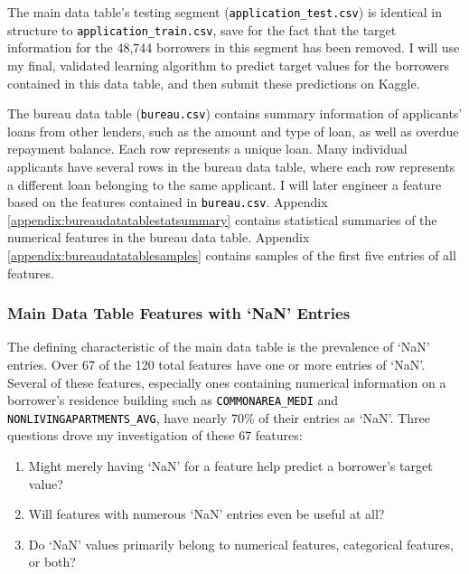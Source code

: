 \documentclass[12pt, letterpaper]{article}
\begin{document}
The main data table's testing segment (\colorbox{backcolor}{\textcolor{black}{\texttt{application_test.csv}}}) is identical in structure to \colorbox{backcolor}{\textcolor{black}{\texttt{application_train.csv}}}, save for the fact that the target information for the 48,744 borrowers in this segment has been removed. I will use my final, validated learning algorithm to predict target values for the borrowers contained in this data table, and then submit these predictions on Kaggle.

The bureau data table (\colorbox{backcolor}{\textcolor{black}{\texttt{bureau.csv}}}) contains summary information of applicants' loans from other lenders, such as the amount and type of loan, as well as overdue repayment balance. Each row represents a unique loan. Many individual applicants have several rows in the bureau data table, where each row represents a different loan belonging to the same applicant. I will later engineer a feature based on the features contained in \colorbox{backcolor}{\textcolor{black}{\texttt{bureau.csv}}}. Appendix \ref{appendix:bureaudatatablestatsummary} contains statistical summaries of the numerical features in the bureau data table. Appendix \ref{appendix:bureaudatatablesamples} contains samples of the first five entries of all features.

\subsubsection{Main Data Table Features with `NaN' Entries}
The defining characteristic of the main data table is the prevalence of `NaN' entries. Over 67 of the 120 total features have one or more entries of `NaN'. Several of these features, especially ones containing numerical information on a borrower's residence building such as \colorbox{backcolor}{\textcolor{black}{\texttt{COMMONAREA_MEDI}}} and
\colorbox{backcolor}{\textcolor{black}{\texttt{NONLIVINGAPARTMENTS_AVG}}}, have nearly 70\% of their entries as `NaN'. Three questions drove my investigation of these 67 features:

\begin{enumerate}
  \item Might merely having `NaN' for a feature help predict a borrower's target value?
  \item Will features with numerous `NaN' entries even be useful at all?
  \item Do `NaN' values primarily belong to numerical features, categorical features, or both?
\end{enumerate}
\end{document}
